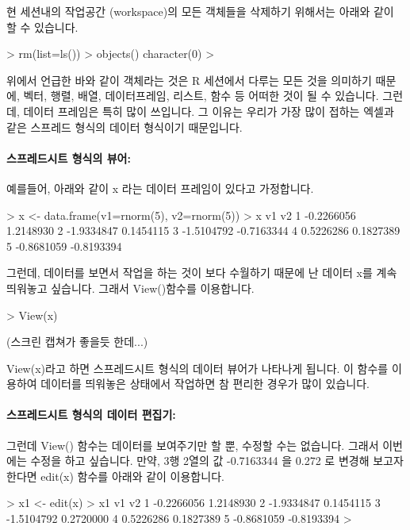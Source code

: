 현 세션내의 작업공간 (workspace)의 모든 객체들을 삭제하기 위해서는 아래와 같이 할 수 있습니다. 

\begin{Schunk}
\begin{Soutput}
> rm(list=ls())
> objects()
character(0)
> 
\end{Soutput}
\end{Schunk}

위에서 언급한 바와 같이 객체라는 것은 R 세션에서 다루는 모든 것을 의미하기 때문에, 벡터, 행렬, 배열, 데이터프레임, 리스트, 함수 등 어떠한  것이 될 수 있습니다. 
그런데, 데이터 프레임은 특히 많이 쓰입니다. 
그 이유는 우리가 가장 많이 접하는 엑셀과 같은 스프레드 형식의 데이터 형식이기 때문입니다.

\paragraph{스프레드시트 형식의 뷰어:}
예를들어, 아래와 같이 x 라는 데이터 프레임이 있다고 가정합니다. 


\begin{Schunk}
\begin{Soutput}
> x <- data.frame(v1=rnorm(5), v2=rnorm(5))
> x
          v1         v2
1 -0.2266056  1.2148930
2 -1.9334847  0.1454115
3 -1.5104792 -0.7163344
4  0.5226286  0.1827389
5 -0.8681059 -0.8193394
\end{Soutput}
\end{Schunk}

그런데, 데이터를 보면서 작업을 하는 것이 보다 수월하기 때문에 난 데이터 x를 계속 띄워놓고 싶습니다.
그래서 View()함수를 이용합니다.
\begin{Schunk}
\begin{Soutput}
> View(x)
\end{Soutput}
\end{Schunk}
(스크린 캡쳐가 좋을듯 한데...)

View(x)라고 하면 스프레드시트 형식의 데이터 뷰어가 나타나게 됩니다. 
이 함수를 이용하여 데이터를 띄워놓은 상태에서 작업하면 참 편리한 경우가 많이 있습니다.

\paragraph{스프레드시트 형식의 데이터 편집기:}
그런데 View() 함수는 데이터를 보여주기만 할 뿐, 수정할 수는 없습니다.
그래서 이번에는 수정을 하고 싶습니다. 
만약, 3행 2열의 값 -0.7163344 을 0.272 로 변경해 보고자 한다면 edit(x) 함수를 아래와 같이 이용합니다.
\begin{Schunk}
\begin{Soutput}
> x1 <- edit(x)
> x1
          v1         v2
1 -0.2266056  1.2148930
2 -1.9334847  0.1454115
3 -1.5104792  0.2720000
4  0.5226286  0.1827389
5 -0.8681059 -0.8193394
> 
\end{Soutput}
\end{Schunk}

